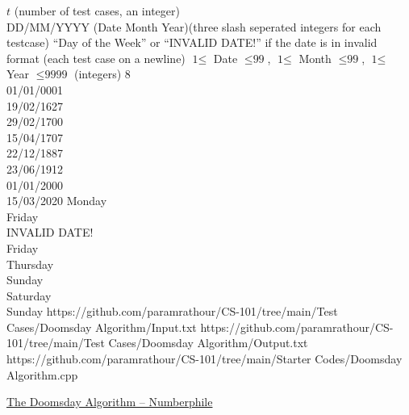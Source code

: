 \documentclass[../../Problems]{subfiles}
\begin{document}
\begin{testcasesMore}
	{$t$ \hfill(number of test cases, an integer)\\
	DD/MM/YYYY (Date Month Year)\hfill(three slash seperated integers for each testcase)}
	{``Day of the Week'' or  ``INVALID DATE!'' if the date is in invalid format
 \hfill{(each test case on a newline)}}
	{$\text{1} \leq$ Date $\leq \text{99}$, $\text{1} \leq$ Month $\leq \text{99}$, $\text{1} \leq$ Year $\leq \text{9999}$ \hfill(integers)}
	{8\\01/01/0001\\19/02/1627\\29/02/1700\\15/04/1707\\22/12/1887\\23/06/1912\\01/01/2000\\15/03/2020}
	{Monday\\Friday\\INVALID DATE!\\Friday\\Thursday\\Sunday\\Saturday\\Sunday}
	{https://github.com/paramrathour/CS-101/tree/main/Test Cases/Doomsday Algorithm/Input.txt}
	{https://github.com/paramrathour/CS-101/tree/main/Test Cases/Doomsday Algorithm/Output.txt}
	{https://github.com/paramrathour/CS-101/tree/main/Starter Codes/Doomsday Algorithm.cpp}
\end{testcasesMore}
\begin{funvideo}{\label{sec:fvdoomsday}}
\href{https://youtu.be/z2x3SSBVGJU}{The Doomsday Algorithm -- Numberphile}
\end{funvideo}
\end{document}
